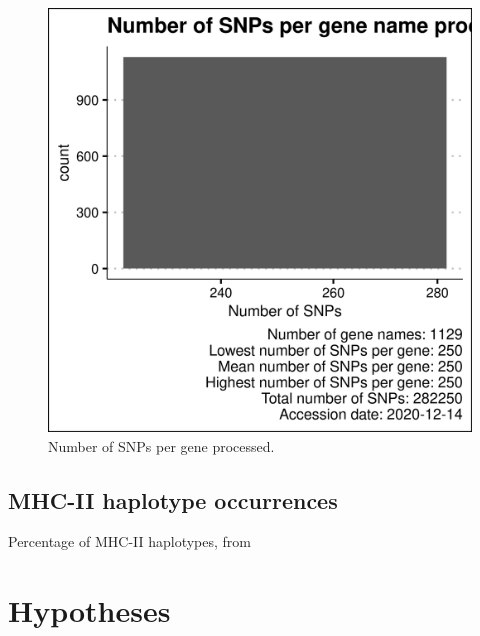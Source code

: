 \begin{figure}[!htbp]
  \includegraphics[width=\textwidth]{ncbi_peregrine_results/fig_snps_per_gene_name_processed.png}
  \caption{
    Number of SNPs per gene processed.
  }
  \label{fig:snps_per_gene_name_processed}
\end{figure}

\subsection{MHC-II haplotype occurrences}

\begin{table}[!htbp]
  
  \caption{
    Percentage of MHC-II haplotypes, from \cite{greenbaum2011functional}
  }
  \label{table:mhc2_haplotypes}
\end{table}

\section{Hypotheses}

